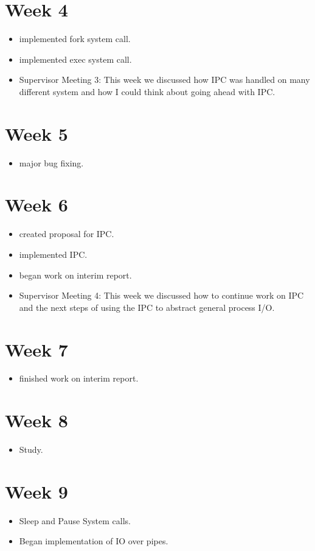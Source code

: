 \documentclass[a4paper]{report}
\begin{document}
\section{Week 4}
\begin{itemize}
\item implemented fork system call.
\item implemented exec system call.
\item Supervisor Meeting 3: This week we discussed how IPC was handled on many different system and how I could think about going ahead with IPC.
\end{itemize}

\section{Week 5}
\begin{itemize}
\item major bug fixing.
\end{itemize}

\section{Week 6}
\begin{itemize}
\item created proposal for IPC.
\item implemented IPC.
\item began work on interim report.
\item Supervisor Meeting 4: This week we discussed how to continue work on IPC and the next steps of using the IPC to abstract general process I/O.
\end{itemize}

\section{Week 7}
\begin{itemize}
\item finished work on interim report.
\end{itemize}

\section{Week 8}
\begin{itemize}
\item Study.
\end{itemize}

\section{Week 9}
\begin{itemize}
\item Sleep and Pause System calls.
\item Began implementation of IO over pipes.
\end{itemize}
\end{document}
